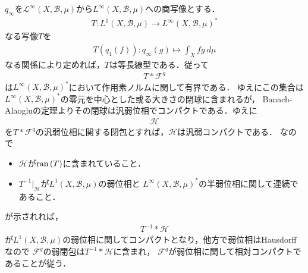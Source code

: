 	\begin{sketch}
		$q_\infty$を$\mathscr{L}^\infty(X,\mathcal{B},\mu)$から$L^\infty(X,\mathcal{B},\mu)$への商写像とする．
		\begin{align}
			T:L^1(X,\mathcal{B},\mu) \longrightarrow L^\infty(X,\mathcal{B},\mu)^*
		\end{align}
		なる写像$T$を
		\begin{align}
			T(q_1(f)):q_\infty(g) \longmapsto \int_X fg\ d\mu
		\end{align}
		なる関係により定めれば，$T$は等長線型である．従って
		\begin{align}
			T \ast \mathscr{F}^q
		\end{align}
		は$L^\infty(X,\mathcal{B},\mu)^*$において作用素ノルムに関して有界である．
		ゆえにこの集合は$L^\infty(X,\mathcal{B},\mu)^*$の零元を中心とした或る大きさの閉球に含まれるが，
		Banach-Alaogluの定理よりその閉球は汎弱位相でコンパクトである．ゆえに
		\begin{align}
			\mathscr{H}
		\end{align}
		を$T \ast \mathscr{F}^q$の汎弱位相に関する閉包とすれば，$\mathscr{H}$は汎弱コンパクトである．
		なので
		\begin{itemize}
			\item $\mathscr{H}$が$\operatorname*{ran} \left(T\right)$に含まれていること．
			\item $T^{-1}|_{\mathscr{H}}$が$L^1(X,\mathcal{B},\mu)$の弱位相と
				$L^\infty(X,\mathcal{B},\mu)^*$の半弱位相に関して連続であること．
		\end{itemize}
		が示されれば，
		\begin{align}
			T^{-1} \ast \mathscr{H}
		\end{align}
		が$L^1(X,\mathcal{B},\mu)$の弱位相に関してコンパクトとなり，他方で弱位相はHausdorffなので
		$\mathscr{F}^q$の弱閉包は$T^{-1} \ast \mathscr{H}$に含まれ，
		$\mathscr{F}^q$が弱位相に関して相対コンパクトであることが従う．
	\end{sketch}
	
